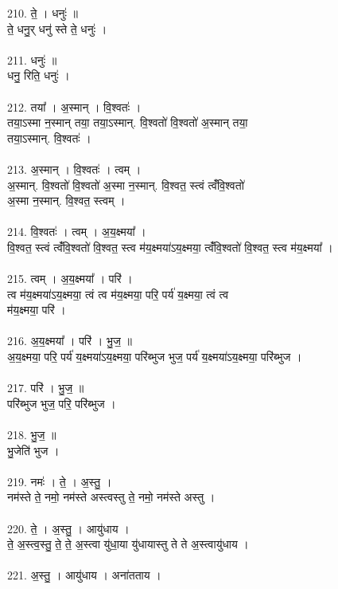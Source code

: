 210. ते॒ । धनुः॑ ॥\\
ते॒ धनु॒र् धनु॑ स्ते ते॒ धनुः॑ ।\\
\\
211. धनुः॑ ॥\\
धनु॒ रिति॒ धनुः॑ ।\\
\\
212. तया᳚ । अ॒स्मान् । वि॒श्वतः॑ ।\\
तया॒ऽस्मा न॒स्मान् तया॒ तया॒ऽस्मान्. वि॒श्वतो॑ वि॒श्वतो॑ अ॒स्मान् तया॒\\
तया॒ऽस्मान्. वि॒श्वतः॑ ।\\
\\
213. अ॒स्मान् । वि॒श्वतः॑ । त्वम् ।\\
अ॒स्मान्. वि॒श्वतो॑ वि॒श्वतो॑ अ॒स्मा न॒स्मान्. वि॒श्वत॒ स्त्वं त्वंँवि॒श्वतो॑\\
अ॒स्मा न॒स्मान्. वि॒श्वत॒ स्त्वम् ।\\
\\
214. वि॒श्वतः॑ । त्वम् । अ॒य॒क्ष्मया᳚ ।\\
वि॒श्वत॒ स्त्वं त्वंँवि॒श्वतो॑ वि॒श्वत॒ स्त्व म॑य॒क्ष्मया॑ऽय॒क्ष्मया॒ त्वंँवि॒श्वतो॑ वि॒श्वत॒ स्त्व म॑य॒क्ष्मया᳚ ।\\
\\
215. त्वम् । अ॒य॒क्ष्मया᳚ । परि॑ ।\\
त्व म॑य॒क्ष्मया॑ऽय॒क्ष्मया॒ त्वं त्व म॑य॒क्ष्मया॒ परि॒ पर्य॑ य॒क्ष्मया॒ त्वं त्व\\
म॑य॒क्ष्मया॒ परि॑ ।\\
\\
216. अ॒य॒क्ष्मया᳚ । परि॑ । भु॒ज॒ ॥\\
अ॒य॒क्ष्मया॒ परि॒ पर्य॑ य॒क्ष्मया॑ऽय॒क्ष्मया॒ परि॑ब्भुज भुज॒ पर्य॑ य॒क्ष्मया॑ऽय॒क्ष्मया॒ परि॑ब्भुज ।\\
\\
217. परि॑ । भु॒ज॒ ॥\\
परि॑ब्भुज भुज॒ परि॒ परि॑ब्भुज ।\\
\\
218. भु॒ज॒ ॥\\
भु॒जेति॑ भुज ।\\
\\
219. नमः॑ । ते॒ । अ॒स्तु॒ ।\\
नम॑स्ते ते॒ नमो॒ नम॑स्ते अस्त्वस्तु ते॒ नमो॒ नम॑स्ते अस्तु ।\\
\\
220. ते॒ । अ॒स्तु॒ । आयु॑धाय ।\\
ते॒ अ॒स्त्व॒स्तु॒ ते॒ ते॒ अ॒स्त्वा यु॑धा॒या यु॑धायास्तु ते ते अ॒स्त्वायु॑धाय ।\\
\\
221. अ॒स्तु॒ । आयु॑धाय । अना॑तताय ।\\
